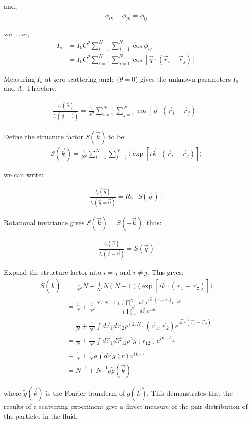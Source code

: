 \documentclass[book.tex]{subfiles}
\begin{document}
\noindent and,
\begin{align}\label{Eq20}
\phi_{ik} - \phi_{jk} = \phi_{ij}
\end{align}

\noindent we have,
\begin{align}\label{Eq21}
I_s &= I_0C^2\sum_{i=1}^N\sum_{j=1}^N\cos\phi_{ij} \\
 &= I_0C^2\sum_{i=1}^N\sum_{j=1}^N\cos[\vec{q}\cdot(\vec{r}_i - \vec{r}_j)]
\end{align}

Measuring $I_s$ at zero scattering angle ($\theta = 0$) gives the unknown parameters $I_0$ and $A$. Therefore,

\begin{align}\label{Eq22}
\frac{I_s(\vec{q})}{I_s(\vec{q}=\vec{0})} = \frac{1}{N^2}\sum_{i=1}^N\sum_{j=1}^N\cos[\vec{q}\cdot(\vec{r}_i - \vec{r}_j)]
\end{align}

Define the structure factor $S(\vec{k})$ to be:
\begin{align}\label{Eq23}
S(\vec{k}) = \frac{1}{N^2}\sum_{i=1}^N\sum_{j=1}^N \bigg\langle \exp\left[ i\vec{k}\cdot (\vec{r}_i - \vec{r}_j) \right] \bigg\rangle
\end{align}

\noindent we can write:

\begin{align}\label{Eq24}
\frac{I_s(\vec{q})}{I_s(\vec{q}=\vec{0})} = Re[S(\vec{q})]
\end{align}

Rotational invariance gives $S(\vec{k}) = S(-\vec{k})$, thus:

\begin{align}\label{Eq25}
\frac{I_s(\vec{q})}{I_s(\vec{q}=\vec{0})} = S(\vec{q})
\end{align} 

Expand the structure factor into $i = j$ and $i \neq j$. This gives:
\begin{align}
S(\vec{k}) & = \frac{1}{N^2}N + \frac{1}{N^2}N(N-1)\bigg\langle \exp\left[ i\vec{k}\cdot (\vec{r}_1 - \vec{r}_2) \right] \bigg\rangle \\
& = \frac{1}{N} + \frac{1}{N^2}\frac{N(N-1)\int\prod_{i=1}^Nd\vec{r}_ie^{i\vec{k}\cdot (\vec{r}_1 - \vec{r}_2)}e^{-\beta U}}{\int\prod_{i=1}^Nd\vec{r}_ie^{-\beta U}}\\
&= \frac{1}{N} + \frac{1}{N^2} \int d\vec{r}_1d\vec{r}_2\rho^{(2,N)}(\vec{r}_1,\vec{r}_2)e^{i\vec{k}\cdot (\vec{r}_1 - \vec{r}_2)} \\
&= \frac{1}{N} + \frac{1}{N^2} \int d\vec{r}_1d\vec{r}_{12}\rho^2g(r_{12})e^{i\vec{k}\cdot\vec{r}_{12}} \\
&= \frac{1}{N} + \frac{1}{N}\rho \int d\vec{r}g(r)e^{i\vec{k}\cdot\vec{r}} \\
&= N^{-1} + N^{-1}\rho\tilde{g}(\vec{k}) 
\end{align}

where $\tilde{g}(\vec{k})$ is the Fourier transform of $g(\vec{k})$. This demonstrates that the results of a scattering experiment give a direct measure of the pair distribution of the particles in the fluid.
\end{document}
